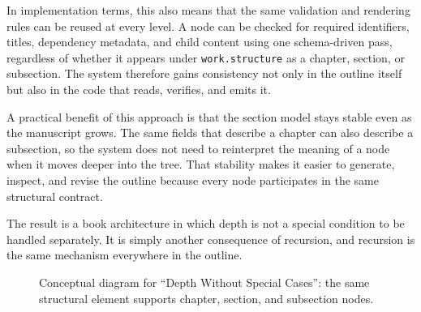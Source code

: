 \documentclass[11pt]{article}
\begin{document}
In implementation terms, this also means that the same validation and rendering rules can be reused at every level. A node can be checked for required identifiers, titles, dependency metadata, and child content using one schema-driven pass, regardless of whether it appears under \texttt{work.structure} as a chapter, section, or subsection. The system therefore gains consistency not only in the outline itself but also in the code that reads, verifies, and emits it.

A practical benefit of this approach is that the section model stays stable even as the manuscript grows. The same fields that describe a chapter can also describe a subsection, so the system does not need to reinterpret the meaning of a node when it moves deeper into the tree. That stability makes it easier to generate, inspect, and revise the outline because every node participates in the same structural contract.

The result is a book architecture in which depth is not a special condition to be handled separately. It is simply another consequence of recursion, and recursion is the same mechanism everywhere in the outline.

\begin{figure}[htbp]
\centering

\caption{Conceptual diagram for ``Depth Without Special Cases'': the same structural element supports chapter, section, and subsection nodes.}
\end{figure}
\end{document}
